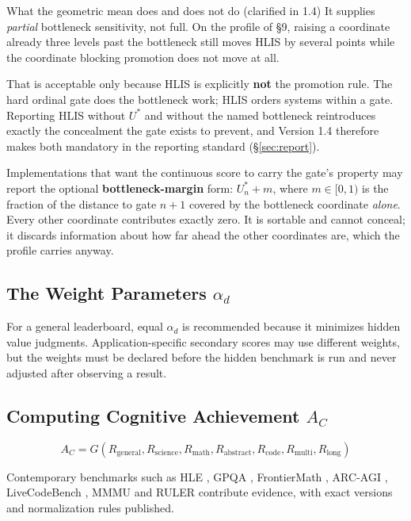 \documentclass[11pt]{article}
\theoremstyle{definition}
\begin{document}
\begin{cautionbox}{What the geometric mean does and does not do (clarified in 1.4)}
It supplies \emph{partial} bottleneck sensitivity, not full. On the profile of \S9, raising a coordinate already three levels past the bottleneck still moves HLIS by several points while the coordinate blocking promotion does not move at all.

That is acceptable only because HLIS is explicitly \textbf{not} the promotion rule. The hard ordinal gate does the bottleneck work; HLIS orders systems within a gate. Reporting HLIS without $U^{*}$ and without the named bottleneck reintroduces exactly the concealment the gate exists to prevent, and Version 1.4 therefore makes both mandatory in the reporting standard (\S\ref{sec:report}).

Implementations that want the continuous score to carry the gate's property may report the optional \textbf{bottleneck-margin} form: $U^{*}_n + m$, where $m \in [0,1)$ is the fraction of the distance to gate $n{+}1$ covered by the bottleneck coordinate \emph{alone}. Every other coordinate contributes exactly zero. It is sortable and cannot conceal; it discards information about how far ahead the other coordinates are, which the profile carries anyway.
\end{cautionbox}

\subsection{The Weight Parameters \texorpdfstring{$\alpha_d$}{alpha-d}}

\sloppy For a general leaderboard, equal $\alpha_d$ is recommended because it minimizes hidden value judgments. Application-specific secondary scores may use different weights, but the weights must be declared before the hidden benchmark is run and never adjusted after observing a result.

\subsection{Computing Cognitive Achievement \texorpdfstring{$A_C$}{A-C}}

\begin{equation}
A_C = G(R_{\text{general}}, R_{\text{science}}, R_{\text{math}}, R_{\text{abstract}}, R_{\text{code}}, R_{\text{multi}}, R_{\text{long}})
\end{equation}

Contemporary benchmarks such as HLE \citep{phan2025hle}, GPQA \citep{rein2023gpqa}, FrontierMath \citep{glazer2024frontiermath}, ARC-AGI \citep{arc2026}, LiveCodeBench \citep{jain2024livecodebench}, MMMU \citep{yue2023mmmu} and RULER \citep{hsieh2024ruler} contribute evidence, with exact versions and normalization rules published.
\end{document}
